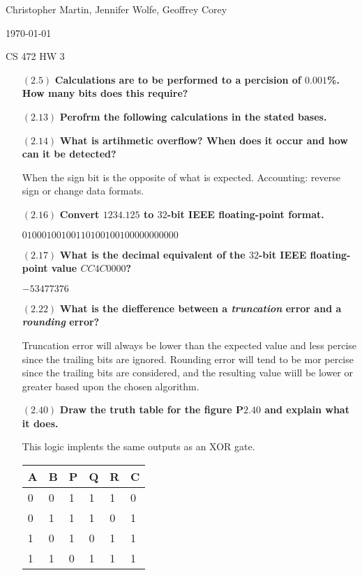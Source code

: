\documentclass[letterpaper,10pt,titlepage]{article}
\def\name{Christopher Martin, Jennifer Wolfe, Geoffrey Corey}
\begin{document}
\hfill \name

\hfill \today

\hfill CS 472 HW 3

\begin{enumerate}
\item[$(2.5)$] \textbf{Calculations are to be performed to a percision of $0.001$\%. How many bits does this require?
}


\item[$(2.13)$] \textbf{Perofrm the following calculations in the stated bases.}

  
\item[$(2.14)$] \textbf{What is artihmetic overflow? When does it occur and how can it be detected?}

  When the sign bit is the opposite of what is expected. Accounting: reverse sign or change data formats.
  
\item[$(2.16)$] \textbf{Convert $1234.125$ to $32$-bit IEEE floating-point format.}

  $01000100100110100100100000000000$  
  
\item[$(2.17)$] \textbf{What is the decimal equivalent of the $32$-bit IEEE floating-point value $CC4C0000$?}

  $-53477376$

\item[$(2.22)$] \textbf{What is the diefference between a \textit{truncation} error and a \textit{rounding} error?}

  Truncation error will always be lower than the expected value and less percise since the trailing bits are ignored.
  Rounding error will tend to be mor percise since the trailing bits are considered, and the resulting value wiill be lower or greater based upon the chosen algorithm.
  
\item[$(2.40)$] \textbf{Draw the truth table for the figure P$2.40$ and explain what it does.}

  This logic implents the same outputs as an XOR gate.
\begin{center}
	\begin{tabular}{ | l  l || l  l  l || l |}
	\hline
	A & B & P & Q & R & C \\ \hline
	0 & 0 & 1 & 1 & 1 & 0 \\ \hline
	0 & 1 & 1 & 1 & 0 & 1 \\ \hline
	1 & 0 & 1 & 0 & 1 & 1 \\ \hline
	1 & 1 & 0 & 1 & 1 & 1 \\ \hline 
	\end{tabular}
\end{center}




\end{enumerate}
\end{document}
